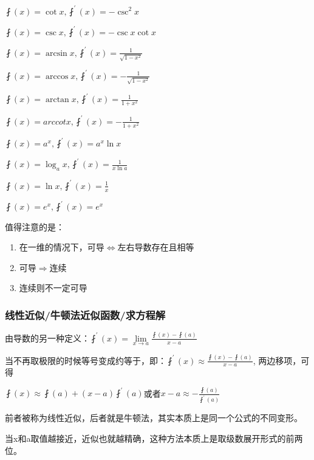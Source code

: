 \documentclass[UTF8]{ctexbook}
\newcommand{\limNormal}[1]{\lim\limits_{#1}}
\newcommand{\derivative}{^\prime}
\newcommand{\myLeftRightArrow}{$\Leftrightarrow$}
\newcommand{\myRightArrow}{$\Rightarrow$}
\newcommand{\fDerivative}[1]{\fint\derivative(#1)}
\newcommand{\defFunction}[1]{\fint(#1)}
\begin{document}
{{{{    $\fint(x) = \cot x, \fint\derivative(x) = -\csc^2 x$

    $\fint(x) = \csc x, \fint\derivative(x) = -\csc x\cot x$

    $\fint(x) = \arcsin x, \fint\derivative(x) = \frac{1}{\sqrt{1 - x^2}}$

    $\fint(x) = \arccos x, \fint\derivative(x) = -\frac{1}{\sqrt{1 - x^2}}$

    $\fint(x) = \arctan x, \fint\derivative(x) = \frac{1}{1 + x^2}$

    $\fint(x) = arccotx, \fint\derivative(x) = -\frac{1}{1 + x^2}$

    $\fint(x) = a^x, \fint\derivative(x) = a^x\ln x$

    $\fint(x) = \log_a x, \fint\derivative(x) = \frac{1}{x\ln a}$

    $\fint(x) = \ln x, \fint\derivative(x)= \frac{1}{x}$

    $\fint(x) = e^x, \fint\derivative(x) = e^x$
  }%
  \newline

  值得注意的是：
  \begin{enumerate}
    \item 在一维的情况下，可导\myLeftRightArrow 左右导数存在且相等

    \item 可导\myRightArrow 连续

    \item 连续则不一定可导
  \end{enumerate}

  \subsubsection{线性近似/牛顿法近似函数/求方程解}{
    由导数的另一种定义：$\fDerivative{x} = \limNormal{x \to a}\frac{\defFunction{x} - \defFunction{a}}{x - a}$

    当不再取极限的时候等号变成约等于，即：$\fDerivative{x} \approx \frac{\defFunction{x} - \defFunction{a}}{x - a}$, 两边移项，可得

    $\defFunction{x} \approx \defFunction{a} + (x-a)\fDerivative{a}$或者$x - a \approx -\frac{\defFunction{a}}{\fDerivative{a}}$

    前者被称为线性近似，后者就是牛顿法，其实本质上是同一个公式的不同变形。

    当x和a取值越接近，近似也就越精确，这种方法本质上是取级数展开形式的前两位。

  }%

}}}
\end{document}

